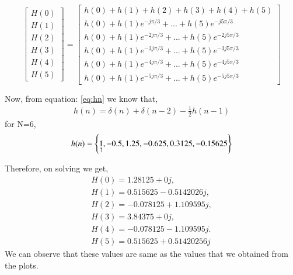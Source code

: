 \documentclass[journal,12pt,twocolumn]{IEEEtran}
\renewcommand\thesection{\arabic{section}}
\begin{document}
\begin{enumerate}[label=\thesection.\arabic*.,ref=\thesection.\theenumi]
\begin{equation}
\begin{bmatrix} H(0) \\ H(1) \\ H(2) \\ H(3) \\ H(4) \\ H(5) \end{bmatrix}
=
\begin{bmatrix}
h(0) + h(1) + h(2) + h(3) + h(4) + h(5) \\h(0) + h(1)e^{-j\pi /3} + ... + h(5)e^{-j5\pi /3}\\h(0) + h(1)e^{-2j\pi /3} + ... + h(5)e^{-2j5\pi /3}\\h(0) + h(1)e^{-3j\pi /3} + ... + h(5)e^{-3j5\pi /3}\\
h(0) + h(1)e^{-4j\pi /3} + ... + h(5)e^{-4j5\pi /3}\\h(0) + h(1)e^{-5j\pi /3} + ... + h(5)e^{-5j5\pi /3}
\end{bmatrix}
\end{equation}
\bigskip

Now, from equation: \eqref{eq:hn} we know that,
\begin{align}
     h(n) = \delta(n) + \delta(n-2) - \frac{1}{2}h(n-1) 
\end{align}
for N=6,
\begin{align}
     h(n) = \left\{\underset{\uparrow}{1},-0.5,1.25,-0.625,0.3125,-0.15625\right\} 
\end{align}

Therefore, on solving we get,
\begin{align}
    H(0) = 1.28125 + 0j,\\
    H(1) = 0.515625 - 0.5142026j,\\
    H(2) = -0.078125 + 1.109595j,\\
    H(3) = 3.84375 + 0j,\\
    H(4) = -0.078125 - 1.109595j.\\
    H(5) = 0.515625 + 0.51420256j
\end{align}
We can observe that these values are same as the values that we obtained from the plots.

\end{enumerate}
\end{document}
